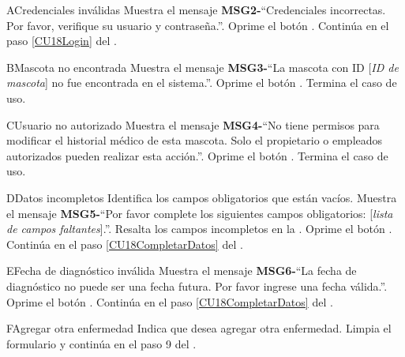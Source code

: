 \begin{UCtrayectoriaA}{A}{Credenciales inválidas}
	\UCpaso Muestra el mensaje {\bf MSG2-}``Credenciales incorrectas. Por favor, verifique  	su usuario y contraseña.''.
	\UCpaso[\UCactor] Oprime el botón .
	\UCpaso Continúa en el paso \ref{CU18Login} del .
\end{UCtrayectoriaA}

\begin{UCtrayectoriaA}{B}{Mascota no encontrada}
	\UCpaso Muestra el mensaje {\bf MSG3-}``La mascota con ID [{\em ID de mascota}] no  	fue encontrada en el sistema.''.
	\UCpaso[\UCactor] Oprime el botón .
	\UCpaso[] Termina el caso de uso.
\end{UCtrayectoriaA}

\begin{UCtrayectoriaA}{C}{Usuario no autorizado}
	\UCpaso Muestra el mensaje {\bf MSG4-}``No tiene permisos para modificar el historial médico  	de esta mascota. Solo el propietario o empleados autorizados pueden realizar esta acción.''.
	\UCpaso[\UCactor] Oprime el botón .
	\UCpaso[] Termina el caso de uso.
\end{UCtrayectoriaA}

\begin{UCtrayectoriaA}{D}{Datos incompletos}
	\UCpaso Identifica los campos obligatorios que están vacíos.
	\UCpaso Muestra el mensaje {\bf MSG5-}``Por favor complete los siguientes campos obligatorios:  	[{\em lista de campos faltantes}].''.
	\UCpaso Resalta los campos incompletos en la .
	\UCpaso[\UCactor] Oprime el botón .
	\UCpaso Continúa en el paso \ref{CU18CompletarDatos} del .
\end{UCtrayectoriaA}

\begin{UCtrayectoriaA}{E}{Fecha de diagnóstico inválida}
	\UCpaso Muestra el mensaje {\bf MSG6-}``La fecha de diagnóstico no puede ser una fecha futura.  	Por favor ingrese una fecha válida.''.
	\UCpaso[\UCactor] Oprime el botón .
	\UCpaso Continúa en el paso \ref{CU18CompletarDatos} del .
\end{UCtrayectoriaA}

\begin{UCtrayectoriaA}{F}{Agregar otra enfermedad}
	\UCpaso[\UCactor] Indica que desea agregar otra enfermedad.
	\UCpaso Limpia el formulario y continúa en el paso 9 del .
\end{UCtrayectoriaA}

